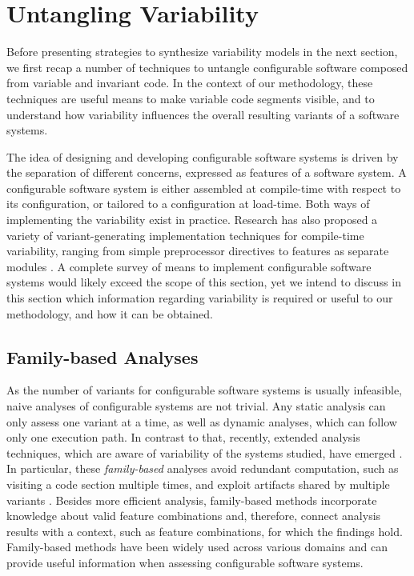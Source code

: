 \section{Untangling Variability}\label{sec:untangling}
Before presenting strategies to synthesize variability models in
the next section, we first recap a number of techniques to untangle configurable
software composed from variable and invariant code. In the context of our
methodology, these techniques are useful means to make variable code segments
visible, and to understand how variability influences the overall resulting
variants of a software systems.

The idea of designing and developing configurable software systems is driven by
the separation of different concerns, expressed as features of a software
system. A configurable software system is either assembled at compile-time with
respect to its configuration, or tailored to a configuration at
load-time. Both ways of implementing the variability exist in practice. Research
has also proposed a variety of variant-generating implementation techniques for
compile-time variability, ranging from simple preprocessor directives to
features as separate modules \citep{kastner_model_2009}.  A complete survey of means to implement
configurable software systems would likely exceed the scope of this section, yet we intend to discuss in this
section which information regarding variability is required or useful to our
methodology, and how it can be obtained.

\subsection{Family-based Analyses}
As the number of variants for configurable software systems is usually
infeasible, naive analyses of configurable systems are not trivial. Any static
analysis can only assess one variant at a time, as well as dynamic analyses,
which can follow only one execution path. 
In contrast to that, recently,
extended analysis techniques, which are aware of variability of the systems
studied, have emerged \citep{thum_classification_2014}. In particular, these
\emph{family-based} analyses avoid redundant computation, such as visiting a
code section multiple times, and exploit artifacts shared by multiple variants
\citep{thum_classification_2014}. Besides more efficient analysis, family-based
methods incorporate knowledge about valid feature combinations
\citep{thum_classification_2014} and, therefore, connect analysis results with
a context, such as feature combinations, for which the findings hold.
Family-based methods have been widely used across various domains and can
provide useful information when assessing configurable software systems.

